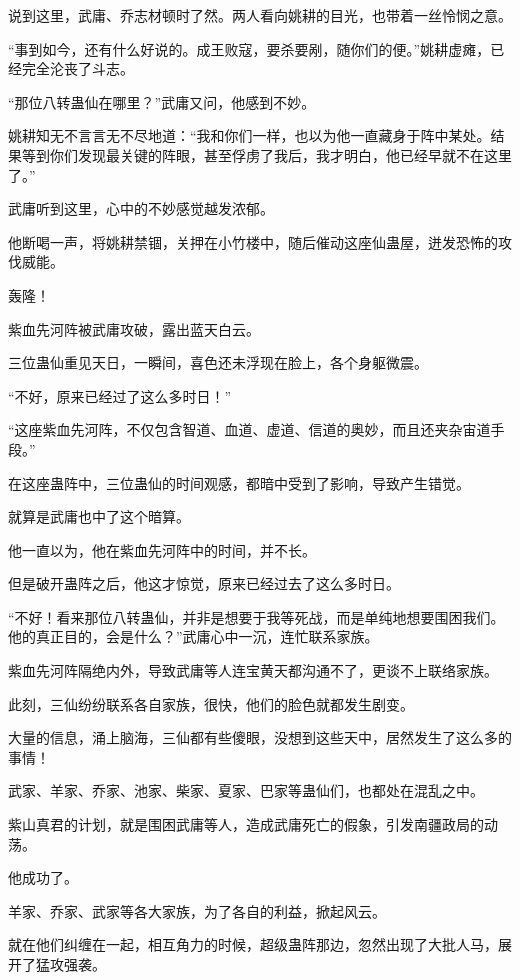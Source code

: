 \begin{this_body}
说到这里，武庸、乔志材顿时了然。两人看向姚耕的目光，也带着一丝怜悯之意。

“事到如今，还有什么好说的。成王败寇，要杀要剐，随你们的便。”姚耕虚瘫，已经完全沦丧了斗志。

“那位八转蛊仙在哪里？”武庸又问，他感到不妙。

姚耕知无不言言无不尽地道：“我和你们一样，也以为他一直藏身于阵中某处。结果等到你们发现最关键的阵眼，甚至俘虏了我后，我才明白，他已经早就不在这里了。”

武庸听到这里，心中的不妙感觉越发浓郁。

他断喝一声，将姚耕禁锢，关押在小竹楼中，随后催动这座仙蛊屋，迸发恐怖的攻伐威能。

轰隆！

紫血先河阵被武庸攻破，露出蓝天白云。

三位蛊仙重见天日，一瞬间，喜色还未浮现在脸上，各个身躯微震。

“不好，原来已经过了这么多时日！”

“这座紫血先河阵，不仅包含智道、血道、虚道、信道的奥妙，而且还夹杂宙道手段。”

在这座蛊阵中，三位蛊仙的时间观感，都暗中受到了影响，导致产生错觉。

就算是武庸也中了这个暗算。

他一直以为，他在紫血先河阵中的时间，并不长。

但是破开蛊阵之后，他这才惊觉，原来已经过去了这么多时日。

“不好！看来那位八转蛊仙，并非是想要于我等死战，而是单纯地想要围困我们。他的真正目的，会是什么？”武庸心中一沉，连忙联系家族。

紫血先河阵隔绝内外，导致武庸等人连宝黄天都沟通不了，更谈不上联络家族。

此刻，三仙纷纷联系各自家族，很快，他们的脸色就都发生剧变。

大量的信息，涌上脑海，三仙都有些傻眼，没想到这些天中，居然发生了这么多的事情！

武家、羊家、乔家、池家、柴家、夏家、巴家等蛊仙们，也都处在混乱之中。

紫山真君的计划，就是围困武庸等人，造成武庸死亡的假象，引发南疆政局的动荡。

他成功了。

羊家、乔家、武家等各大家族，为了各自的利益，掀起风云。

就在他们纠缠在一起，相互角力的时候，超级蛊阵那边，忽然出现了大批人马，展开了猛攻强袭。


\end{this_body}
